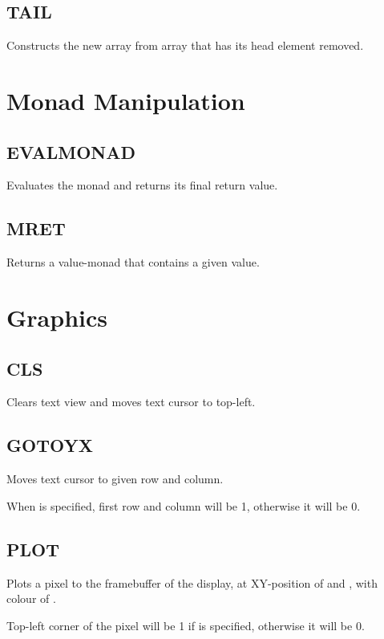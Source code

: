     \subsection{TAIL}
        \par
        Constructs the new array from array  that has its head element removed.

\section{Monad Manipulation}

    \subsection{EVALMONAD}
        \par
        Evaluates the monad and returns its final return value.
    \subsection{MRET}
        \par
        Returns a value-monad that contains a given value.
        
\section{Graphics}

    \subsection{CLS}
        \par
        Clears text view and moves text cursor to top-left.
    \subsection{GOTOYX}
        \par
        Moves text cursor to given row and column.\par
        When  is specified, first row and column will be 1, otherwise it will be 0.
    \subsection{PLOT}
        \par
        Plots a pixel to the framebuffer of the display, at XY-position of  and , with colour of .\par
        Top-left corner of the pixel will be 1 if  is specified, otherwise it will be 0.

